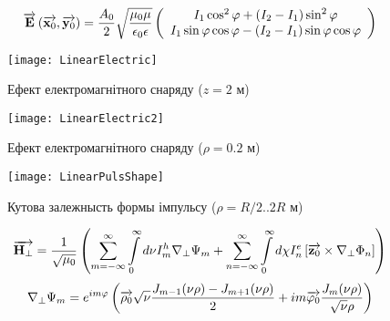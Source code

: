 %
\begin{equation*} \begin{aligned}
\overrightarrow{\mathbf E} \left( \overrightarrow{\mathbf x_0}, \overrightarrow{\mathbf y_0} \right) = \frac{A_0}{2} 
\sqrt{\frac{\mu_0 \mu}{\epsilon_0 \epsilon}} \left( \begin{array}{c} 
I_1 \cos^2 \varphi + (I_2 - I_1) \sin^2 \varphi \\
I_1 \sin \varphi \cos \varphi - (I_2 - I_1) 
\sin \varphi \cos \varphi \end{array} \right)
\end{aligned} \end{equation*}
%
\begin{figure}[h] \begin{center}
\texttt{[image: LinearElectric]}
\caption{Ефект електромагнітного снаряду ($ z = 2 $ м)} \label{fig:emp_rho}
\end{center} \end{figure}
%
\begin{figure}[h] \begin{center}
\texttt{[image: LinearElectric2]}
\caption{Ефект електромагнітного снаряду ($ \rho = 0.2 $ м)} \label{fig:emp_z}
\end{center} \end{figure}
%
\begin{figure}[h] \begin{center}
\texttt{[image: LinearPulsShape]}
\caption{Кутова залежнысть формы імпульсу ($ \rho = R/2 .. 2R $ м)} 
\label{fig:emp_shape}
\end{center} \end{figure}
%
\textcolor{lightgray} { \begin{equation*} \begin{aligned}
\overrightarrow{\mathbf H_\perp} = \frac{1}{\sqrt{\mu_0}} \left( 
\sum \limits_{m=-\infty}^{\infty} \int \limits_{0}^{\infty} d \nu
I_m^h \nabla_\perp \Psi_m + \sum \limits_{n=-\infty}^{\infty}
\int \limits_{0}^{\infty} d \chi I_n^e 
\left[ \overrightarrow{\mathbf z_0} \times \nabla_\perp \Phi_n \right] \right)
\end{aligned} \end{equation*} }
%
\textcolor{lightgray} { \begin{equation*} \begin{aligned}
\nabla_\perp \Psi_m = e^{i m \varphi} \left( \overrightarrow{\mathbf \rho_0} 
\sqrt{\nu} \frac{ J_{m-1}(\nu \rho) - J_{m+1}(\nu \rho) }{2} +
i m \overrightarrow{\mathbf \varphi_0} \frac{J_m(\nu \rho)}{\sqrt{\nu} \rho} \right)
\end{aligned} \end{equation*} }
